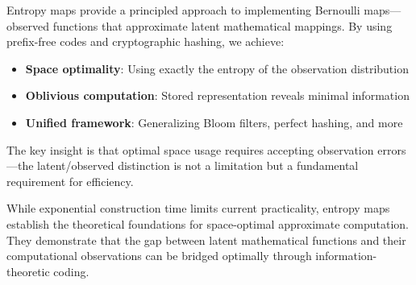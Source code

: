 \documentclass[11pt,final,hidelinks]{article}
\begin{document}
Entropy maps provide a principled approach to implementing Bernoulli maps—observed functions that approximate latent mathematical mappings. By using prefix-free codes and cryptographic hashing, we achieve:

\begin{itemize}
    \item \textbf{Space optimality}: Using exactly the entropy of the observation distribution
    \item \textbf{Oblivious computation}: Stored representation reveals minimal information
    \item \textbf{Unified framework}: Generalizing Bloom filters, perfect hashing, and more
\end{itemize}

The key insight is that optimal space usage requires accepting observation errors—the latent/observed distinction is not a limitation but a fundamental requirement for efficiency.

While exponential construction time limits current practicality, entropy maps establish the theoretical foundations for space-optimal approximate computation. They demonstrate that the gap between latent mathematical functions and their computational observations can be bridged optimally through information-theoretic coding.


\end{document}
